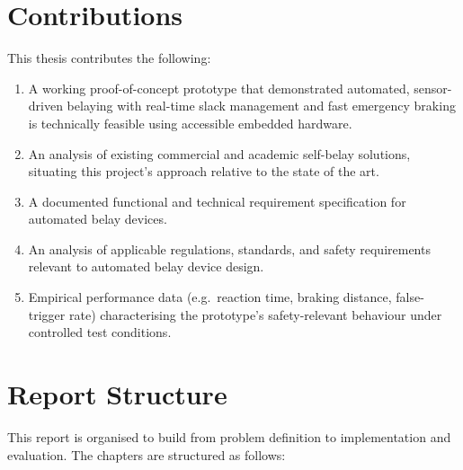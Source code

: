 \section{Contributions}
\label{sec:contributions}

This thesis contributes the following:

\begin{enumerate}
    \item A working proof-of-concept prototype that demonstrated
        automated, sensor-driven belaying with real-time slack management
        and fast emergency braking is technically feasible using
        accessible embedded hardware.
    \item An analysis of existing commercial and academic self-belay
        solutions, situating this project's approach relative to the
        state of the art.
    \item A documented functional and technical requirement
        specification for automated belay devices.
    \item An analysis of applicable regulations, standards, and safety
        requirements relevant to automated belay device design.
    \item Empirical performance data (e.g.\ reaction time, braking
        distance, false-trigger rate) characterising the prototype's
        safety-relevant behaviour under controlled test conditions.
\end{enumerate}

\section{Report Structure}
\label{sec:report-structure}

This report is organised to build from problem definition to
implementation and evaluation. The chapters are structured as follows:

